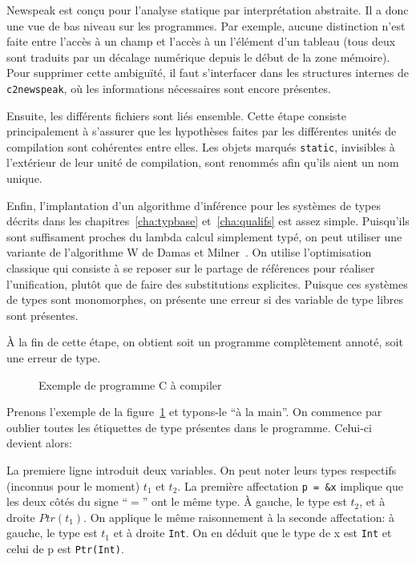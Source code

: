 Newspeak est conçu pour l'analyse statique par interprétation abstraite. Il a
donc une vue de bas niveau sur les programmes. Par exemple, aucune distinction
n'est faite entre l'accès à un champ et l'accès à un l'élément d'un tableau
(tous deux sont traduits par un décalage numérique depuis le début de la zone
mémoire). Pour supprimer cette ambiguïté, il faut s'interfacer dans les
structures internes de \texttt{c2newspeak}, où les informations nécessaires sont
encore présentes.

Ensuite, les différents fichiers sont liés ensemble. Cette étape consiste
principalement à s'assurer que les hypothèses faites par les différentes unités
de compilation sont cohérentes entre elles. Les objets marqués \texttt{static},
invisibles à l'extérieur de leur unité de compilation, sont renommés afin qu'ils
aient un nom unique.

Enfin, l'implantation d'un algorithme d'inférence pour les systèmes de types
décrits dans les chapitres~\ref{cha:typbase} et~\ref{cha:qualifs} est assez
simple. Puisqu'ils sont suffisament proches du lambda calcul simplement typé, on
peut utiliser une variante de l'algorithme W de Damas et
Milner~\cite{DamasMilner}. On utilise l'optimisation classique qui consiste à se
reposer sur le partage de références pour réaliser l'unification, plutôt que de
faire des substitutions explicites. Puisque ces systèmes de types sont
monomorphes, on présente une erreur si des variable de type libres sont
présentes.

À la fin de cette étape, on obtient soit un programme complètement annoté, soit
une erreur de type.

\begin{figure} %


  \caption{Exemple de programme C à compiler}
\label{fig:exunif:c}
\end{figure} %

Prenons l'exemple de la figure~\ref{fig:exunif:c} et typons-le ``à la main''. On
commence par oublier toutes les étiquettes de type présentes dans le programme.
Celui-ci devient alors:


La premiere ligne introduit deux variables. On peut noter leurs types respectifs
(inconnus pour le moment) $t_1$ et $t_2$. La première affectation \texttt{p =
\&x} implique que les deux côtés du signe ``$=$'' ont le même type. À gauche, le
type est $t_2$, et à droite $Ptr(t_1)$. On applique le même raisonnement à la
seconde affectation: à gauche, le type est $t_1$ et à droite \texttt{Int}. On en
déduit que le type de x est \texttt{Int} et celui de p est \verb!Ptr(Int)!.

